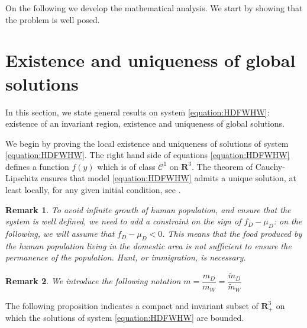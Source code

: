 \documentclass{article}
\newcommand{\mW}{\tilde{m}_W}
\newcommand{\mD}{\tilde{m}_D}
\newtheorem{remark}{Remark}
\begin{document}
On the following we develop the mathematical analysis. We start by showing that the problem is well posed.

\section{Existence and uniqueness of global solutions}
In this section, we state general results on system \eqref{equation:HDFWHW}:  existence of an invariant region, existence and uniqueness of global solutions.

We begin by proving the local existence and uniqueness of solutions of system \eqref{equation:HDFWHW}. The right hand side of equations \eqref{equation:HDFWHW} defines a function $f(y)$ which is of class $\mathcal{C}^1$ on $\mathbf{R}^3$. The theorem of Cauchy-Lipschitz ensures that model \eqref{equation:HDFWHW} admits a unique solution, at least locally, for any given initial condition, see \cite{walter_ordinary_1998}.

\begin{remark}
To avoid infinite growth of human population, and ensure that the system is well defined, we need to add a constraint on the sign of $f_D - \mu_D$: on the following, we will assume that $f_D - \mu_D < 0$. This means that the food produced by the human population living in the domestic area is not sufficient to ensure the permanence of the population. Hunt, or immigration, is necessary. 
\end{remark}
\begin{remark}
We introduce the following notation $m = \dfrac{m_D}{m_W} = \dfrac{\mD}{\mW}$
\end{remark}

The following proposition indicates a compact and invariant subset of $\mathbf{R}_+^3$ on which the solutions of system \eqref{equation:HDFWHW} are bounded.
\end{document}
